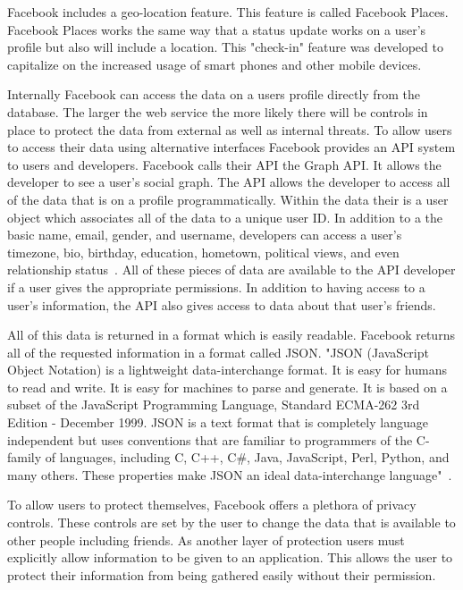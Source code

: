 Facebook includes a geo-location feature. This feature is called Facebook Places.
Facebook Places works the same way that a status update works on a user's
profile but also will include a location. This "check-in" feature was developed
to capitalize on the increased usage of smart phones and other mobile devices.

Internally Facebook can access the data on a users profile directly from the
database. The larger the web service the more likely there will be controls in
place to protect the data from external as well as internal threats. To allow
users to access their data using alternative interfaces Facebook provides an API
system to users and developers. Facebook calls their API the Graph API. It
allows the developer to see a user's social graph. The API allows the developer
to access all of the data that is on a profile programmatically. Within the data
their is a user object which associates all of the data to a unique user ID. In
addition to a the basic name, email, gender, and username, developers can access
a user's timezone, bio, birthday, education, hometown, political views, and even
relationship status~\cite{fbapi}. All of these pieces of data are available to
the API developer if a
user gives the appropriate permissions. In addition to having access to a user's
information, the API also gives access to data about that user's friends.

All of this data is returned in a format which is easily readable. Facebook
returns all of the requested information in a format called JSON. "JSON
(JavaScript Object Notation) is a lightweight data-interchange format. It is
easy for humans to read and write. It is easy for machines to parse and
generate. It is based on a subset of the JavaScript Programming Language,
Standard ECMA-262 3rd Edition - December 1999. JSON is a text format that is
completely language independent but uses conventions that are familiar to
programmers of the C-family of languages, including C, C++, C\#, Java,
JavaScript, Perl, Python, and many others. These properties make JSON an ideal
data-interchange language"~\cite{JSON}.

To allow users to protect themselves, Facebook offers a plethora of privacy
controls. These controls are set by the user to change the data that is
available to other people including friends. As another layer of protection
users must explicitly allow information to be given to an application. This
allows the user to protect their information from being gathered easily without
their permission.

